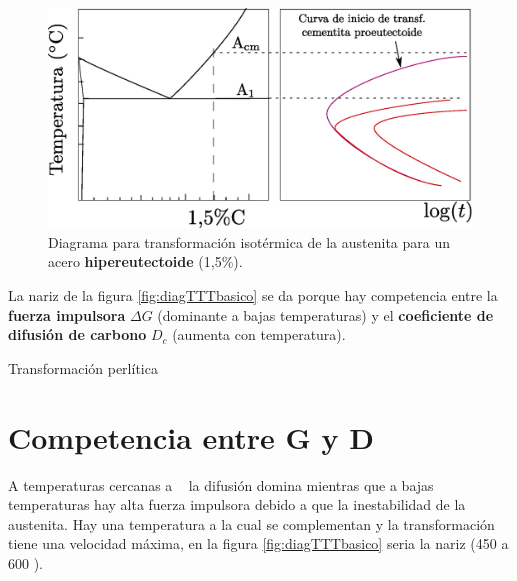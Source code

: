 \begin{figure}[htb!]
    \centering
    \includegraphics[width=\textwidth]{fig/diagTTThiper.eps}
    \caption{Diagrama para transformación isotérmica de la austenita para un acero \textbf{hipereutectoide} (1,5\%).}
    \label{fig:diagTTThiper}
\end{figure}

La nariz de la figura \ref{fig:diagTTTbasico} se da porque hay competencia entre la \textbf{fuerza impulsora} $\Delta G$ (dominante a bajas temperaturas) y el \textbf{coeficiente de difusión de carbono} $D_c$ (aumenta con temperatura).

Transformación perlítica



\section{Competencia entre G y D}
A temperaturas cercanas a \Aone~ la difusión domina mientras que a bajas temperaturas hay alta fuerza impulsora debido a que la inestabilidad de la austenita. Hay una temperatura a la cual se complementan y la transformación tiene una velocidad máxima, en la figura \ref{fig:diagTTTbasico} seria la nariz (450 a 600 \grad).

